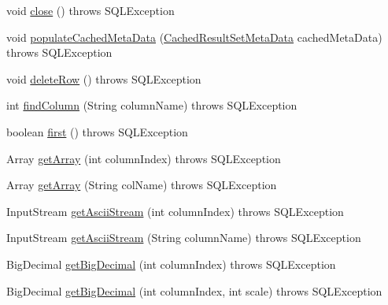 \begin{DoxyCompactItemize}
void \mbox{\hyperlink{classcom_1_1mysql_1_1cj_1_1jdbc_1_1result_1_1_result_set_impl_a09d9ef619232fd78635a6fad7761c0f0}{close}} ()  throws S\+Q\+L\+Exception 
\item 
void \mbox{\hyperlink{classcom_1_1mysql_1_1cj_1_1jdbc_1_1result_1_1_result_set_impl_ad7430baab428d355723d41517ec3ae0d}{populate\+Cached\+Meta\+Data}} (\mbox{\hyperlink{interfacecom_1_1mysql_1_1cj_1_1jdbc_1_1result_1_1_cached_result_set_meta_data}{Cached\+Result\+Set\+Meta\+Data}} cached\+Meta\+Data)  throws S\+Q\+L\+Exception 
\item 
void \mbox{\hyperlink{classcom_1_1mysql_1_1cj_1_1jdbc_1_1result_1_1_result_set_impl_ade9cb9f9fd7a0609939adcc747383ba3}{delete\+Row}} ()  throws S\+Q\+L\+Exception 
\item 
int \mbox{\hyperlink{classcom_1_1mysql_1_1cj_1_1jdbc_1_1result_1_1_result_set_impl_a32083ce28873f9c14bc9c3f8b1e59b4c}{find\+Column}} (String column\+Name)  throws S\+Q\+L\+Exception 
\item 
boolean \mbox{\hyperlink{classcom_1_1mysql_1_1cj_1_1jdbc_1_1result_1_1_result_set_impl_aad1e90b6dcfe8ce0bf0cc66401fa44de}{first}} ()  throws S\+Q\+L\+Exception 
\item 
Array \mbox{\hyperlink{classcom_1_1mysql_1_1cj_1_1jdbc_1_1result_1_1_result_set_impl_af8ef8a846b00a759b9bff5b76e97423b}{get\+Array}} (int column\+Index)  throws S\+Q\+L\+Exception 
\item 
Array \mbox{\hyperlink{classcom_1_1mysql_1_1cj_1_1jdbc_1_1result_1_1_result_set_impl_a6ce9a2ba581cc52ba769f247a0bb387a}{get\+Array}} (String col\+Name)  throws S\+Q\+L\+Exception 
\item 
Input\+Stream \mbox{\hyperlink{classcom_1_1mysql_1_1cj_1_1jdbc_1_1result_1_1_result_set_impl_ad6690718311a18ebd9592711ef55d583}{get\+Ascii\+Stream}} (int column\+Index)  throws S\+Q\+L\+Exception 
\item 
Input\+Stream \mbox{\hyperlink{classcom_1_1mysql_1_1cj_1_1jdbc_1_1result_1_1_result_set_impl_ad02c3d6d05735e7dc1701f3c59020427}{get\+Ascii\+Stream}} (String column\+Name)  throws S\+Q\+L\+Exception 
\item 
Big\+Decimal \mbox{\hyperlink{classcom_1_1mysql_1_1cj_1_1jdbc_1_1result_1_1_result_set_impl_a7aace48259e95bf573ad2849be794ac5}{get\+Big\+Decimal}} (int column\+Index)  throws S\+Q\+L\+Exception 
\item 
Big\+Decimal \mbox{\hyperlink{classcom_1_1mysql_1_1cj_1_1jdbc_1_1result_1_1_result_set_impl_ad71886bd5659ff1a4d0eee906821a1db}{get\+Big\+Decimal}} (int column\+Index, int scale)  throws S\+Q\+L\+Exception 

\end{DoxyCompactItemize}
